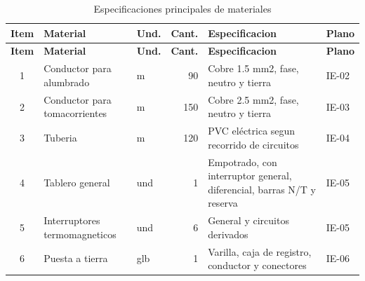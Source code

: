 \begin{landscape}
{\scriptsize
\setlength{\tabcolsep}{3pt}
\begin{longtable}{c L{3.0cm}L{1.0cm}r L{3.4cm}L{1.4cm}}
\caption{Especificaciones principales de materiales}\label{tab:especificaciones-materiales}\\
\toprule
\textbf{Item} & \textbf{Material} & \textbf{Und.} & \textbf{Cant.} & \textbf{Especificacion} & \textbf{Plano} \\
\midrule
\endfirsthead
\toprule
\textbf{Item} & \textbf{Material} & \textbf{Und.} & \textbf{Cant.} & \textbf{Especificacion} & \textbf{Plano} \\
\midrule
{} & Conductor para alumbrado & m & 90 & Cobre 1.5 mm2, fase, neutro y tierra & IE-02 \\
2 & Conductor para tomacorrientes & m & 150 & Cobre 2.5 mm2, fase, neutro y tierra & IE-03 \\
3 & Tuberia & m & 120 & PVC eléctrica segun recorrido de circuitos & IE-04 \\
4 & Tablero general & und & 1 & Empotrado, con interruptor general, diferencial, barras N/T y reserva & IE-05 \\
5 & Interruptores termomagneticos & und & 6 & General y circuitos derivados & IE-05 \\
6 & Puesta a tierra & glb & 1 & Varilla, caja de registro, conductor y conectores & IE-06 \\
\bottomrule
\end{longtable}
}
\end{landscape}
